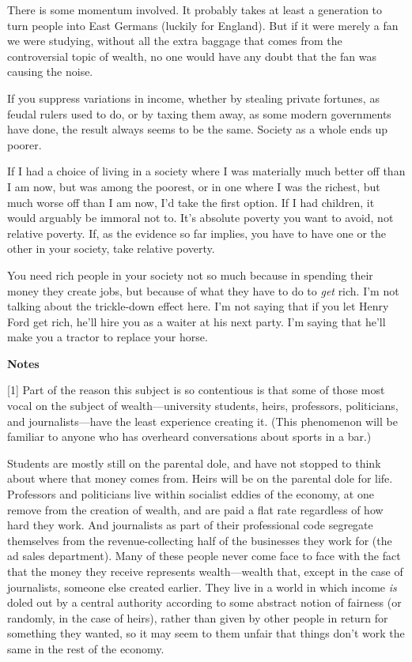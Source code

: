 There is some momentum involved. It probably takes at least a generation
to turn people into East Germans (luckily for England). But if it were
merely a fan we were studying, without all the extra baggage that comes
from the controversial topic of wealth, no one would have any doubt that
the fan was causing the noise.

If you suppress variations in income, whether by stealing private
fortunes, as feudal rulers used to do, or by taxing them away, as some
modern governments have done, the result always seems to be the same.
Society as a whole ends up poorer.

If I had a choice of living in a society where I was materially much
better off than I am now, but was among the poorest, or in one where I
was the richest, but much worse off than I am now, I'd take the first
option. If I had children, it would arguably be immoral not to. It's
absolute poverty you want to avoid, not relative poverty. If, as the
evidence so far implies, you have to have one or the other in your
society, take relative poverty.

You need rich people in your society not so much because in spending
their money they create jobs, but because of what they have to do to
\emph{get} rich. I'm not talking about the trickle-down effect here. I'm
not saying that if you let Henry Ford get rich, he'll hire you as a
waiter at his next party. I'm saying that he'll make you a tractor to
replace your horse.

\textbf{Notes}

{[}1{]} Part of the reason this subject is so contentious is that some
of those most vocal on the subject of wealth---university students,
heirs, professors, politicians, and journalists---have the least
experience creating it. (This phenomenon will be familiar to anyone who
has overheard conversations about sports in a bar.)

Students are mostly still on the parental dole, and have not stopped to
think about where that money comes from. Heirs will be on the parental
dole for life. Professors and politicians live within socialist eddies
of the economy, at one remove from the creation of wealth, and are paid
a flat rate regardless of how hard they work. And journalists as part of
their professional code segregate themselves from the revenue-collecting
half of the businesses they work for (the ad sales department). Many of
these people never come face to face with the fact that the money they
receive represents wealth---wealth that, except in the case of
journalists, someone else created earlier. They live in a world in which
income \emph{is} doled out by a central authority according to some
abstract notion of fairness (or randomly, in the case of heirs), rather
than given by other people in return for something they wanted, so it
may seem to them unfair that things don't work the same in the rest of
the economy.

